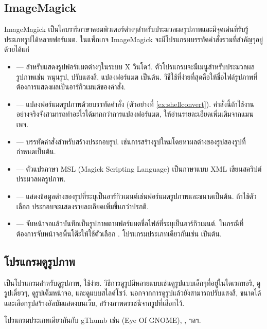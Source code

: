 \begin{thwbr}
\subsection{ImageMagick}
ImageMagick เป็นไลบรารีภาษาคอมพิวเตอร์ต่างๆสำหรับประมวลผลรูปภาพและมีจุดเด่นที่รับรู้ประเภทรูปได้หลายฟอร์แมต. ในแพ็กเกจ ImageMagick จะมีโปรแกรมบรรทัดคำสั่งรวมที่สำคัญๆอยู่ด้วยได้แก่
\begin{itemize}
\item {} --- สำหรับแสดงรูปฟอร์แมตต่างๆในระบบ X วินโดว์. ตัวโปรแกรมจะมีเมนูสำหรับประมวลผลรูปภาพเช่น หนุนรูป, ปรับแสงสี, แปลงฟอร์แมต เป็นต้น. วิธีใช้ที่ง่ายที่สุดคือให้ชื่อไฟล์รูปภาพที่ต้องการแสดงผลเป็นอาร์กิวเมนต์ของคำสั่ง.
\item {} --- แปลงฟอร์แมตรูปภาพด้วยบรรทัดคำสั่ง (ตัวอย่างที่ \ref{ex:shellconvert}). คำสั่งนี้ถ้าใช้งานอย่างจริงจังสามารถทำอะไรได้มากกว่าการแปลงฟอร์แมต, ให้อ่านรายละเอียดเพิ่มเติมจากแมนเพจ.
\item {} --- บรรทัดคำสั่งสำหรับสร้างประกอบรูป. เช่นการสร้างรูปใหม่โดยหาผลต่างของรูปสองรูปที่กำหนดเป็นต้น.
\item {} --- ตัวแปรภาษา MSL (Magick Scripting Language) เป็นภาษาแบบ XML เขียนสคริปต์ประมวลผลรูปภาพ. 
\item {} --- แสดงข้อมูลต่างของรูปที่ระบุเป็นอาร์กิวเมนต์เช่นฟอร์แมตรูปภาพและขนาดเป็นต้น. ถ้าใช้ตัวเลือก  ประกอบจะแสดงรายละเอียดเพิ่มขึ้นกว่าปรกติ.
\item {} --- จับหน้าจอแล้วบันทึกเป็นรูปภาพตามฟอร์แมตชื่อไฟล์ที่ระบุเป็นอาร์กิวเมนต์. ในกรณีที่ต้องการจับหน้าจอพื้นโต็ะให้ใช้ตัวเลือก . โปรแกรมประเภทเดียวกันเช่น  เป็นต้น.
\end{itemize}

\subsection{โปรแกรมดูรูปภาพ}
 เป็นโปรแกรมสำหรับดูรูปภาพ, ใช้ง่าย. วิธีการดูรูปมีหลายแบบเช่นดูรูปแบบเล็กๆที่อยู่ในไดเรกทอรี, ดูรูปเดี่ยวๆ, ดูรูปเต็มหน้าจอ, และดูแบบสไลด์โชว์. นอกจากการดูรูปแล้วยังสามารถปรับแสงสี, ขนาดได้และเลือกรูปสร้างอัลบัมแสดงบนเว็บ, สร้างภาพดรรชนีจากรูปที่เลือกไว้.

โปรแกรมประเภทเดียวกันกับ gThumb เช่น  (Eye Of GNOME), ,  ฯลฯ.


\end{thwbr}
